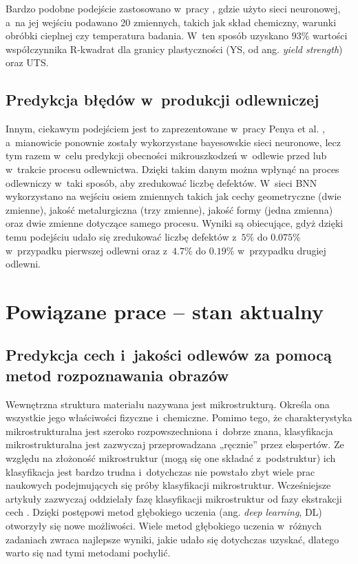Bardzo podobne podejście zastosowano w~pracy \cite{Wang20}, gdzie użyto sieci neuronowej, a~na jej wejściu podawano 20 zmiennych, takich jak skład chemiczny, warunki obróbki cieplnej czy temperatura badania. W~ten sposób uzyskano $93\%$ wartości współczynnika R-kwadrat dla granicy plastyczności (YS, od ang. \textit{yield strength}) oraz UTS.

\subsection{Predykcja błędów w~produkcji odlewniczej}
\label{sub:predykcja.2}

Innym, ciekawym podejściem jest to zaprezentowane w~pracy Penya et al. \cite{Yoseba08}, a~mianowicie ponownie zostały wykorzystane bayesowskie sieci neuronowe, lecz tym razem w~celu predykcji obecności mikrouszkodzeń w~odlewie przed lub w~trakcie procesu odlewnictwa. Dzięki takim danym można wpłynąć na proces odlewniczy w~taki sposób, aby zredukować liczbę defektów. W~sieci BNN wykorzystano na wejściu osiem zmiennych takich jak cechy geometryczne (dwie zmienne), jakość metalurgiczna (trzy zmienne), jakość formy (jedna zmienna) oraz dwie zmienne dotyczące samego procesu. Wyniki są obiecujące, gdyż dzięki temu podejściu udało się zredukować liczbę defektów z~$5\%$ do $0.075\%$ w~przypadku pierwszej odlewni oraz z~$4.7\%$ do $0.19\%$ w~przypadku drugiej odlewni.

\section{Powiązane prace – stan aktualny}
\label{sec:stan.aktualny}

\subsection{Predykcja cech i~jakości odlewów za pomocą metod rozpoznawania obrazów}
\label{sub:predykcja.3}

Wewnętrzna struktura materiału nazywana jest mikrostrukturą. Określa ona wszystkie jego właściwości fizyczne i~chemiczne. Pomimo tego, że charakterystyka mikrostrukturalna jest szeroko rozpowszechniona i~dobrze znana, klasyfikacja mikrostrukturalna jest zazwyczaj przeprowadzana „ręcznie” przez ekspertów. Ze względu na złożoność mikrostruktur (mogą się one składać z~podstruktur) ich klasyfikacja jest bardzo trudna i~dotychczas nie powstało zbyt wiele prac naukowych podejmujących się próby klasyfikacji mikrostruktur. Wcześniejsze artykuły zazwyczaj oddzielały fazę klasyfikacji mikrostruktur od fazy ekstrakcji cech \cite{Azimi18}. Dzięki postępowi metod głębokiego uczenia (ang. \textit{deep learning}, DL) otworzyły się nowe możliwości. Wiele metod głębokiego uczenia w~różnych zadaniach zwraca najlepsze wyniki, jakie udało się dotychczas uzyskać, dlatego warto się nad tymi metodami pochylić. 

